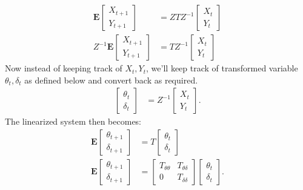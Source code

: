 \documentclass[12pt]{article}
\begin{document}
\begin{align*}
\mathbf{E}\begin{bmatrix} X_{t+1} \\ Y_{t+1} \end{bmatrix} & = ZTZ^{-1} \begin{bmatrix} X_{t} \\ Y_{t} \end{bmatrix} \\
Z^{-1}\mathbf{E}\begin{bmatrix} X_{t+1} \\ Y_{t+1} \end{bmatrix} & = TZ^{-1} \begin{bmatrix} X_{t} \\ Y_{t} \end{bmatrix}
\end{align*}
Now instead of keeping track of $X_t, Y_t$, we'll keep track of transformed variable $\theta_t, \delta_t$ as defined below and convert back as required.
\begin{align*}
\begin{bmatrix} \theta_t \\ \delta_t \end{bmatrix} & = Z^{-1} \begin{bmatrix} X_t \\ Y_t \end{bmatrix}.
\end{align*}
The linearized system then becomes:
\begin{align*}
\mathbf{E}\begin{bmatrix} \theta_{t+1} \\ \delta_{t+1} \end{bmatrix} & = T \begin{bmatrix} \theta_{t} \\ \delta_{t} \end{bmatrix} \\
\mathbf{E}\begin{bmatrix} \theta_{t+1} \\ \delta_{t+1} \end{bmatrix} & = \begin{bmatrix} T_{\theta \theta} & T_{\theta \delta} \\ 0 & T_{\delta \delta} \end{bmatrix} \begin{bmatrix} \theta_{t} \\ \delta_{t} \end{bmatrix}.
\end{align*}
\end{document}
